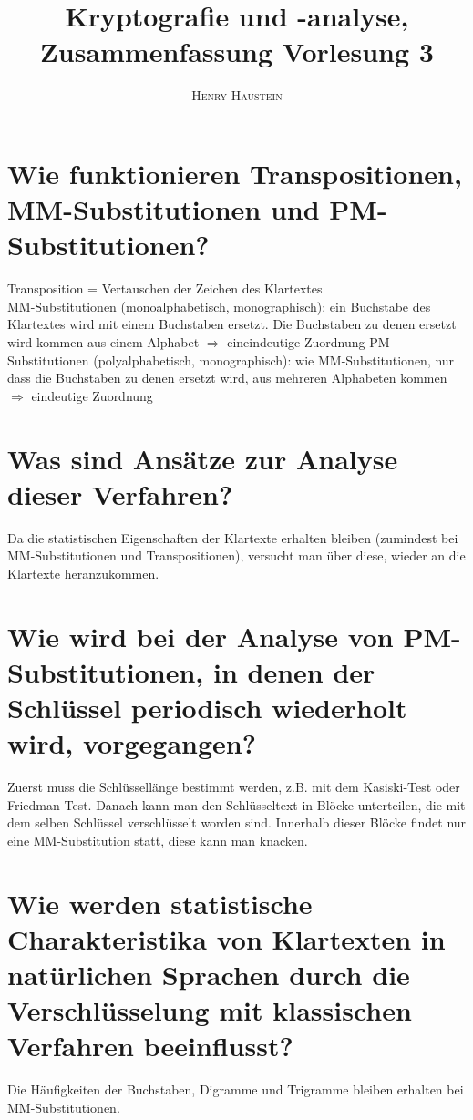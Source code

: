 \documentclass{article}
\title{\textbf{Kryptografie und -analyse, Zusammenfassung Vorlesung 3}}
\author{\textsc{Henry Haustein}}
\date{}
\begin{document}
	\maketitle
	
	\section*{Wie funktionieren Transpositionen, MM-Substitutionen und PM-Substitutionen?}
	Transposition = Vertauschen der Zeichen des Klartextes \\
	MM-Substitutionen (monoalphabetisch, monographisch): ein Buchstabe des Klartextes wird mit einem Buchstaben ersetzt. Die Buchstaben zu denen ersetzt wird kommen aus einem Alphabet $\Rightarrow$ eineindeutige Zuordnung
	PM-Substitutionen (polyalphabetisch, monographisch): wie MM-Substitutionen, nur dass die Buchstaben zu denen ersetzt wird, aus mehreren Alphabeten kommen $\Rightarrow$ eindeutige Zuordnung

	\section*{Was sind Ansätze zur Analyse dieser Verfahren?}
	Da die statistischen Eigenschaften der Klartexte erhalten bleiben (zumindest bei MM-Substitutionen und Transpositionen), versucht man über diese, wieder an die Klartexte heranzukommen.
	
	\section*{Wie wird bei der Analyse von PM-Substitutionen, in denen der Schlüssel periodisch wiederholt wird, vorgegangen?}
	Zuerst muss die Schlüssellänge bestimmt werden, z.B. mit dem Kasiski-Test oder Friedman-Test. Danach kann man den Schlüsseltext in Blöcke unterteilen, die mit dem selben Schlüssel verschlüsselt worden sind. Innerhalb dieser Blöcke findet nur eine MM-Substitution statt, diese kann man knacken.
	
	\section*{Wie werden statistische Charakteristika von Klartexten in natürlichen Sprachen durch die Verschlüsselung mit klassischen Verfahren beeinflusst?}
	Die Häufigkeiten der Buchstaben, Digramme und Trigramme bleiben erhalten bei MM-Substitutionen.
\end{document}
